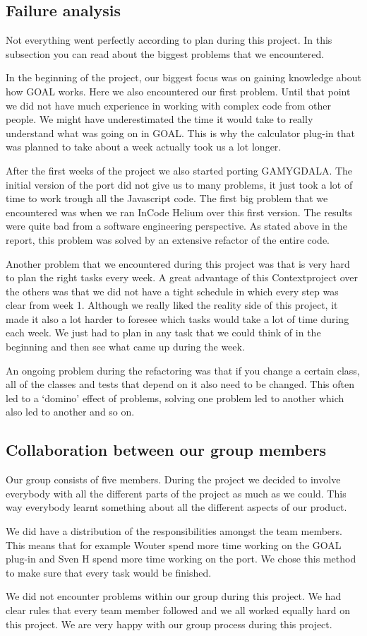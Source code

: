\subsection{Failure analysis}
Not everything went perfectly according to plan during this project. In this subsection you can read about the biggest problems that we encountered. \par 
In the beginning of the project, our biggest focus was on gaining knowledge about how GOAL works. Here we also encountered our first problem. Until that point we did not have much experience in working with complex code from other people. We might have underestimated the time it would take to really understand what was going on in GOAL. This is why the calculator plug-in that was planned to take about a week actually took us a lot longer. \par
After the first weeks of the project we also started porting GAMYGDALA. The initial version of the port did not give us to many problems, it just took a lot of time to work trough all the Javascript code. The first big problem that we encountered was when we ran InCode Helium \citep{incode} over this first version. The results were quite bad from a software engineering perspective. As stated above in the report, this problem was solved by an extensive refactor of the entire code. \par
Another problem that we encountered during this project was that is very hard to plan the right tasks every week. A great advantage of this Contextproject over the others was that we did not have a tight schedule in which every step was clear from week 1. Although we really liked the reality side of this project, it made it also a lot harder to foresee which tasks would take a lot of time during each week. We just had to plan in any task that we could think of in the beginning and then see what came up during the week. \par
An ongoing problem during the refactoring was that if you change a certain class, all of the classes and tests that depend on it also need to be changed. This often led to a `domino' effect of problems, solving one problem led to another which also led to another and so on.

\subsection{Collaboration between our group members}
Our group consists of five members. During the project we decided to involve everybody with all the different parts of the project as much as we could. This way everybody learnt something about all the different aspects of our product. \par
We did have a distribution of the responsibilities amongst the team members. This means that for example Wouter spend more time working on the GOAL plug-in and Sven H spend more time working on the port. We chose this method to make sure that every task would be finished. \par
We did not encounter problems within our group during this project. We had clear rules that every team member followed and we all worked equally hard on this project. We are very happy with our group process during this project.

